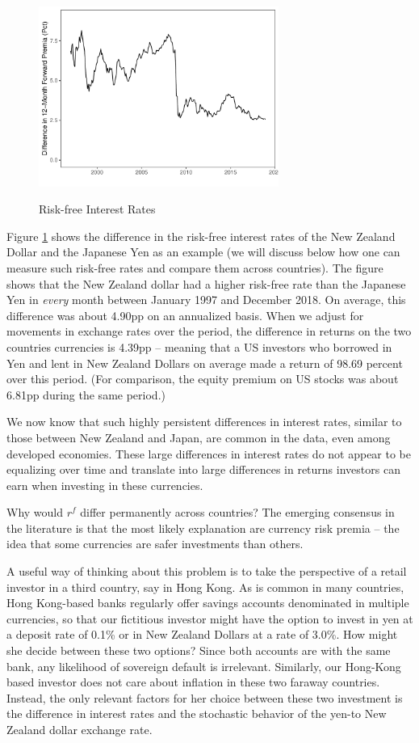 \documentclass{ar-1col}
\begin{document}
\begin{figure}
  \centering
  \caption{Risk-free Interest Rates}
  \includegraphics[width=0.7\textwidth]{Exhibits/Figure_FP12M_DiffJPYNZD.pdf}
  \label{fig:fp}
\end{figure}
Figure \ref{fig:fp} shows the difference in the risk-free interest
rates of the New Zealand Dollar and the Japanese Yen as an example (we
will discuss below how one can measure such risk-free rates and
compare them across countries). The figure shows that the New Zealand
dollar had a higher risk-free rate than the Japanese Yen in
\textit{every} month between January 1997 and December 2018. On average,
this difference was about 4.90pp on an annualized basis. When we
adjust for movements in exchange rates over the period, the difference
in returns on the two countries currencies is 4.39pp -- meaning that a
US investors who borrowed in Yen and lent in New Zealand Dollars on
average made a return of 98.69 percent over this period. (For comparison,
the equity premium on US stocks was about 6.81pp during the same
period.)

We now know that such highly persistent differences in interest rates,
similar to those between New Zealand and Japan, are common in the
data, even among developed economies. These large differences in
interest rates do not appear to be equalizing over time and translate
into large differences in returns investors can earn when investing in
these currencies.

Why would $r^f$ differ permanently across countries? The emerging
consensus in the literature is that the most likely explanation are
currency risk premia -- the idea that some currencies are safer
investments than others.

A useful way of thinking about this problem is to take the perspective
of a retail investor in a third country, say in Hong Kong. As is
common in many countries, Hong Kong-based banks regularly offer
savings accounts denominated in multiple currencies, so that our
fictitious investor might have the option to invest in yen at a
deposit rate of 0.1\% or in New Zealand Dollars at a rate of 3.0\%.
How might she decide between these two options? Since both accounts
are with the same bank, any likelihood of sovereign default is
irrelevant. Similarly, our Hong-Kong based investor does not care
about inflation in these two faraway countries. Instead, the only
relevant factors for her choice between these two investment is the
difference in interest rates and the stochastic behavior of the yen-to
New Zealand dollar exchange rate.
\end{document}
